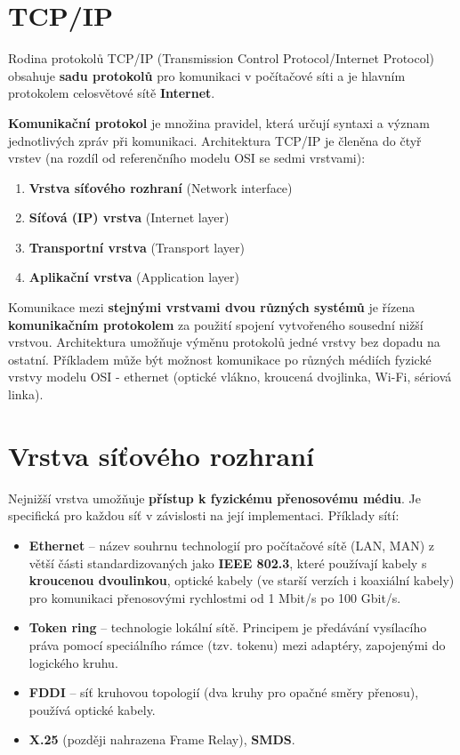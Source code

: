 \section{TCP/IP}
Rodina protokolů TCP/IP (Transmission Control Protocol/Internet Protocol) obsahuje \textbf{sadu protokolů} pro komunikaci v počítačové síti a je hlavním protokolem celosvětové sítě \textbf{Internet}.

\textbf{Komunikační protokol} je množina pravidel, která určují syntaxi a význam jednotlivých zpráv při komunikaci. Architektura TCP/IP je členěna do čtyř vrstev (na rozdíl od referenčního modelu OSI se sedmi vrstvami):

\begin{enumerate}
    \item \textbf{Vrstva síťového rozhraní} (Network interface)
    \item \textbf{Síťová (IP) vrstva} (Internet layer)
    \item \textbf{Transportní vrstva} (Transport layer)
    \item \textbf{Aplikační vrstva }(Application layer)
\end{enumerate}

\noindent{}

Komunikace mezi \textbf{stejnými vrstvami dvou různých systémů} je řízena \textbf{komunikačním protokolem} za použití spojení vytvořeného sousední nižší vrstvou. Architektura umožňuje výměnu protokolů jedné vrstvy bez dopadu na ostatní. Příkladem může být možnost komunikace po různých médiích fyzické vrstvy modelu OSI - ethernet (optické vlákno, kroucená dvojlinka, Wi-Fi, sériová linka).


\section{Vrstva síťového rozhraní}
Nejnižší vrstva umožňuje \textbf{přístup k fyzickému přenosovému médiu}. Je specifická pro každou síť v závislosti na její implementaci. Příklady sítí:
\begin{itemize}
    \item \textbf{Ethernet} --  název souhrnu technologií pro počítačové sítě (LAN, MAN) z větší části standardizovaných jako \textbf{IEEE 802.3}, které používají kabely s \textbf{kroucenou dvoulinkou}, optické kabely (ve starší verzích i koaxiální kabely) pro komunikaci přenosovými rychlostmi od 1 Mbit/s po 100 Gbit/s.
    \item \textbf{Token ring} -- technologie lokální sítě. Principem je předávání vysílacího práva pomocí speciálního rámce (tzv. tokenu) mezi adaptéry, zapojenými do logického kruhu.
    \item \textbf{FDDI} -- síť kruhovou topologií (dva kruhy pro opačné směry přenosu), používá optické kabely.
    \item \textbf{X.25} (později nahrazena Frame Relay), \textbf{SMDS}.
\end{itemize}


